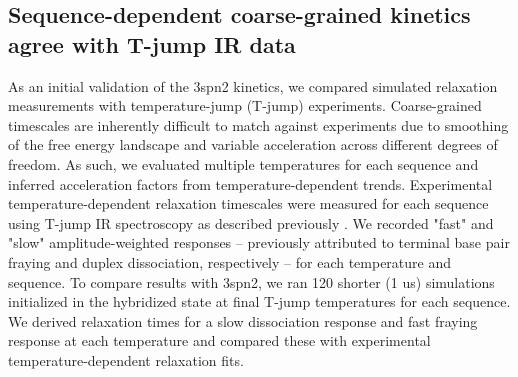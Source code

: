 \documentclass[journal=jpcbfk,manuscript=article]{achemso}
\begin{document}

\subsection{Sequence-dependent coarse-grained kinetics agree with T-jump IR data}


As an initial validation of the 3spn2 kinetics, we compared simulated relaxation measurements with temperature-jump (T-jump) experiments. Coarse-grained timescales are inherently difficult to match against experiments due to smoothing of the free energy landscape and variable acceleration across different degrees of freedom. As such, we evaluated multiple temperatures for each sequence and inferred acceleration factors from temperature-dependent trends.  Experimental temperature-dependent relaxation timescales were measured for each sequence using T-jump IR spectroscopy as described previously \citep{Sanstead2018DirectDehybridization}. We recorded "fast" and "slow" amplitude-weighted responses -- previously attributed to terminal base pair fraying and duplex dissociation, respectively -- for each temperature and sequence. To compare results with 3spn2, we ran 120 shorter (1 us) simulations initialized in the hybridized state at final T-jump temperatures for each sequence. We derived relaxation times for a slow dissociation response and fast fraying response at each temperature and compared these with experimental temperature-dependent relaxation fits.
\end{document}
